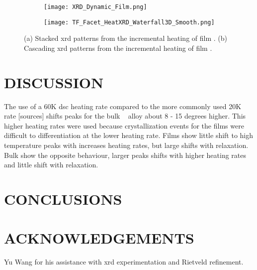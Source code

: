 \documentclass[a4paper,12pt,oneside]{article}%
\begin{document}
\begin{figure}[b]
	\centering
	\begin{subfigure}[htbp]{0.75\textwidth}
		\texttt{[image: XRD\_Dynamic\_Film.png]}
		\caption{}
		\label{fig:XRD_Dynamic_FullStack_Film}
	\end{subfigure}
	\begin{subfigure}[htbp]{0.75\textwidth}
		\texttt{[image: TF\_Facet\_HeatXRD\_Waterfall3D\_Smooth.png]}
		\caption{}
		\label{fig:XRD_Dynamic_WaterFall_Film}
	\end{subfigure}
	\caption{(a) Stacked \gls{xrd} patterns from the incremental heating of film \MgZnCa. (b) Cascading \gls{xrd} patterns from the incremental heating of film \MgZnCa. }%
	\label{fig:XRD_Dynamic_Film}
\end{figure}


\section{DISCUSSION}

The use of a 60K \gls{dsc} heating rate compared to the more commonly used 20K rate [sources] shifts peaks for the bulk \MgZnCa~ alloy about 8 - 15 degrees higher. This higher heating rates were used because crystallization events for the films were difficult to differentiation at the lower heating rate. 
Films show little shift to high temperature peaks with increases heating rates, but large shifts with relaxation. 
Bulk show the opposite behaviour, larger peaks shifts with higher heating rates and little shift with relaxation.


\section{CONCLUSIONS}


\section{ACKNOWLEDGEMENTS}

Yu Wang for his assistance with \acrshort{xrd} experimentation and Rietveld refinement. 





\end{document}
